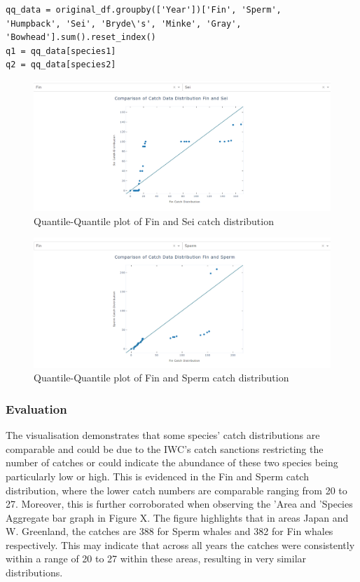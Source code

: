 \documentclass[12pt,a4paper]{article}
\begin{document}
\begin{verbatim}
qq_data = original_df.groupby(['Year'])['Fin', 'Sperm',
'Humpback', 'Sei', 'Bryde\'s', 'Minke', 'Gray', 
'Bowhead'].sum().reset_index()
q1 = qq_data[species1]
q2 = qq_data[species2]
\end{verbatim}

\begin{figure}[H]
    \centering
    \includegraphics[width = 15cm]{Fin+Sei.png}
    \caption{Quantile-Quantile plot of Fin and Sei catch distribution}
    \label{fig:my_label}
\end{figure}

\begin{figure}[H]
    \centering
    \includegraphics[width = 15cm]{Fin+Sperm.png}
    \caption{Quantile-Quantile plot of Fin and Sperm catch distribution}
    \label{fig:my_label}
\end{figure}

\subsubsection{Evaluation}
The visualisation demonstrates that some species' catch distributions are comparable and could be due to the IWC's catch sanctions restricting the number of catches or could indicate the abundance of these two species being particularly low or high. 
This is evidenced in the Fin and Sperm catch distribution, where the lower catch numbers are comparable ranging from 20 to 27. Moreover, this is further corroborated when observing the 'Area and 'Species Aggregate bar graph in Figure X. The figure highlights that in areas Japan and W. Greenland, the catches are 388 for Sperm whales and 382 for Fin whales respectively. This may indicate that across all years the catches were consistently within a range of 20 to 27 within these areas, resulting in very similar distributions. 
\end{document}

